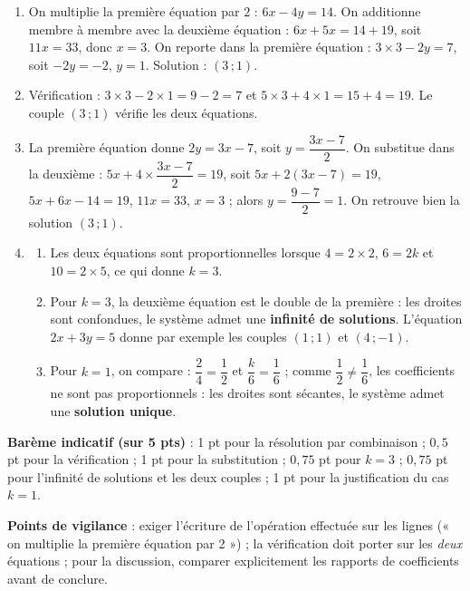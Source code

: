 \documentclass[11pt]{article}
\begin{document}
\begin{corrige}
\begin{enumerate}
\item On multiplie la première équation par $2$ : $6x-4y=14$. On additionne membre à membre avec la deuxième équation : $6x+5x=14+19$, soit $11x=33$, donc $x=3$. On reporte dans la première équation : $3\times 3-2y=7$, soit $-2y=-2$, $y=1$. Solution : $(3\,;1)$.
\item Vérification : $3\times 3-2\times 1=9-2=7$ et $5\times 3+4\times 1=15+4=19$. Le couple $(3\,;1)$ vérifie les deux équations.
\item La première équation donne $2y=3x-7$, soit $y=\dfrac{3x-7}{2}$. On substitue dans la deuxième : $5x+4\times\dfrac{3x-7}{2}=19$, soit $5x+2(3x-7)=19$, $5x+6x-14=19$, $11x=33$, $x=3$ ; alors $y=\dfrac{9-7}{2}=1$. On retrouve bien la solution $(3\,;1)$.
\item \begin{enumerate}
\item Les deux équations sont proportionnelles lorsque $4=2\times 2$, $6=2k$ et $10=2\times 5$, ce qui donne $k=3$.
\item Pour $k=3$, la deuxième équation est le double de la première : les droites sont confondues, le système admet une \textbf{infinité de solutions}. L'équation $2x+3y=5$ donne par exemple les couples $(1\,;1)$ et $(4\,;-1)$.
\item Pour $k=1$, on compare : $\dfrac{2}{4}=\dfrac{1}{2}$ et $\dfrac{k}{6}=\dfrac{1}{6}$ ; comme $\dfrac{1}{2}\neq\dfrac{1}{6}$, les coefficients ne sont pas proportionnels : les droites sont sécantes, le système admet une \textbf{solution unique}.
\end{enumerate}
\end{enumerate}
\textbf{Barème indicatif (sur 5 pts)} : 1 pt pour la résolution par combinaison ; $0{,}5$ pt pour la vérification ; 1 pt pour la substitution ; $0{,}75$ pt pour $k=3$ ; $0{,}75$ pt pour l'infinité de solutions et les deux couples ; 1 pt pour la justification du cas $k=1$.\par
\textbf{Points de vigilance} : exiger l'écriture de l'opération effectuée sur les lignes (« on multiplie la première équation par 2 ») ; la vérification doit porter sur les \emph{deux} équations ; pour la discussion, comparer explicitement les rapports de coefficients avant de conclure.
\end{corrige}
\end{document}
